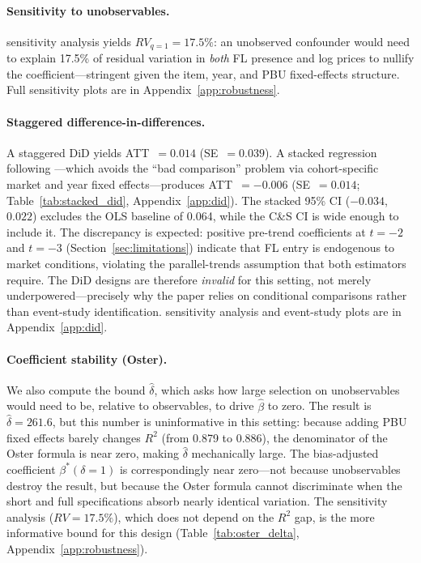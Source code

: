 \paragraph{Sensitivity to unobservables.}
\citet{cinelli2020making} sensitivity analysis yields $RV_{q=1} =
17.5\%$: an unobserved confounder would need to explain 17.5\% of
residual variation in \emph{both} FL presence and log prices to nullify
the coefficient---stringent given the item, year, and PBU fixed-effects
structure. Full sensitivity plots are in
Appendix~\ref{app:robustness}.


\paragraph{Staggered difference-in-differences.}
A \citet{callaway2021difference} staggered DiD yields ATT~$= 0.014$
(SE~$= 0.039$). A stacked regression following
\citet{cengiz2019effect}---which avoids the ``bad comparison''
problem via cohort-specific market and year fixed effects---produces
ATT~$= -0.006$ (SE~$= 0.014$;
Table~\ref{tab:stacked_did}, Appendix~\ref{app:did}).
The stacked 95\% CI ($-0.034$, $0.022$) excludes the OLS
baseline of 0.064, while the C\&S CI is wide enough to include
it. The discrepancy is expected: positive pre-trend coefficients
at $t = -2$ and $t = -3$ (Section~\ref{sec:limitations}) indicate
that FL entry is endogenous to market conditions, violating the
parallel-trends assumption that both estimators require. The DiD
designs are therefore \emph{invalid} for this setting, not merely
underpowered---precisely why the paper relies on conditional
comparisons rather than event-study identification.
\citet{rambachan2023more} sensitivity analysis and
event-study plots are in Appendix~\ref{app:did}.

\paragraph{Coefficient stability (Oster).}
We also compute the \citet{oster2019unobservable} bound
$\hat{\delta}$, which asks how large selection on unobservables would
need to be, relative to observables, to drive $\hat{\beta}$ to zero.
The result is $\hat{\delta} = 261.6$, but this number is
uninformative in this setting: because adding PBU fixed effects
barely changes $R^2$ (from 0.879 to 0.886), the denominator of
the Oster formula is near zero, making $\hat{\delta}$ mechanically
large. The bias-adjusted coefficient $\beta^*(\delta = 1)$ is
correspondingly near zero---not because unobservables destroy the
result, but because the Oster formula cannot discriminate when the
short and full specifications absorb nearly identical variation.
The \citet{cinelli2020making} sensitivity analysis ($RV = 17.5\%$),
which does not depend on the $R^2$ gap, is the more informative
bound for this design
(Table~\ref{tab:oster_delta}, Appendix~\ref{app:robustness}).


